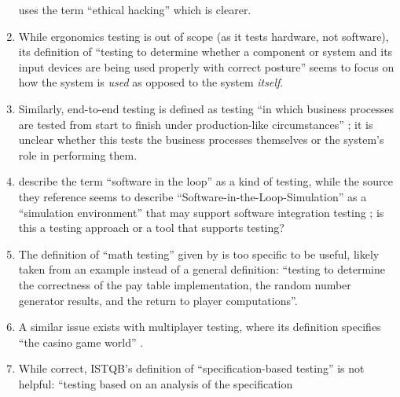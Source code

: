 \begin{enumerate}
          \citet[p.~28]{Gerrard2000b} uses the term ``ethical hacking'' which
          is clearer.
    \item %
          While ergonomics testing is out of scope (as it tests hardware, not
          software), its definition of ``testing to determine whether a
          component or system and its input devices are being used properly
          with correct posture'' \citepISTQB{} seems to focus on how the
          system is \emph{used} as opposed to the system \emph{itself}.
    \item %
          Similarly, end-to-end testing is defined as testing ``in which
          business processes are tested from start to finish under
          production-like circumstances'' \citepISTQB{}; it is unclear
          whether this tests the business processes themselves or the system's
          role in performing them.
    \item %
          \citetISTQB{} describe the term ``software in the loop'' as a
          kind of testing, while the source they reference
          seems to describe
          ``Software-in-the-Loop-Simulation'' as a ``simulation environment''
          that may support software integration testing
          \citep[p.~153]{SPICE2022}; is this a testing approach or a tool
          that supports testing?
    \item %
          The definition of ``math testing'' given by \citetISTQB{} is
          too specific to be useful, likely taken from an example instead of
          a general definition: ``testing to determine the correctness of the
          pay table implementation, the random number generator results, and
          the return to player computations''.
    \item %
          A similar issue exists with multiplayer testing, where its
          definition specifies ``the casino game world'' \citepISTQB{}.
    \item %
          While correct, ISTQB's definition of ``specification-based testing''
          is not helpful: ``testing based on an analysis of the specification

\end{enumerate}

